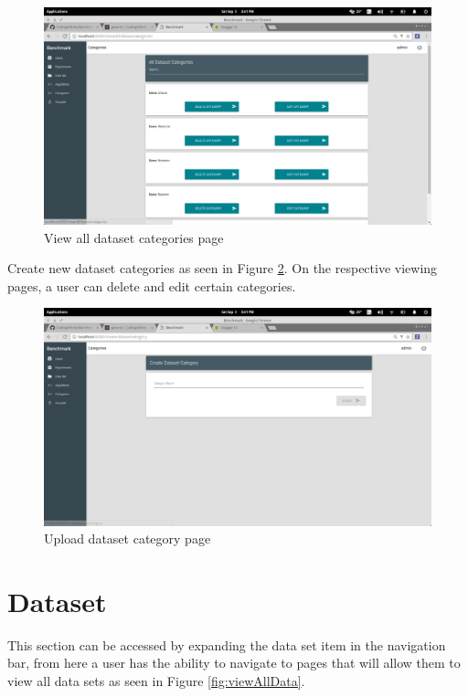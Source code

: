 \documentclass[11pt,a4paper]{article}
\begin{document}
\begin{figure}[H]
	\begin{center}
		\includegraphics[scale=0.3]{../Images/User Manual/View Dataset Categories.png}
		\caption{View all dataset categories page}
		\label{fig:viewDataCat}
	\end{center}  
\end{figure}
\clearpage
Create new dataset categories as seen in Figure \ref{fig:createDataCat}.
On the respective viewing pages, a user can delete and edit certain categories.
\begin{figure}[H]
	\begin{center}
		\includegraphics[scale=0.3]{../Images/User Manual/Create Dataset Category.png}
		\caption{Upload dataset category page}
		\label{fig:createDataCat}
	\end{center}  
\end{figure}

\section{Dataset}
This section can be accessed by expanding the data set item in the navigation bar, from
here a user has the ability to navigate to pages that will allow them to view all data
sets as seen in Figure \ref{fig:viewAllData}.
\end{document}
